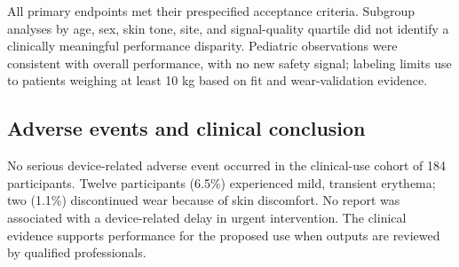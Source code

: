 All primary endpoints met their prespecified acceptance criteria. Subgroup analyses by age, sex, skin tone, site, and signal-quality quartile did not identify a clinically meaningful performance disparity. Pediatric observations were consistent with overall performance, with no new safety signal; labeling limits use to patients weighing at least 10 kg based on fit and wear-validation evidence.

\subsection{Adverse events and clinical conclusion}
No serious device-related adverse event occurred in the clinical-use cohort of 184 participants. Twelve participants (6.5\%) experienced mild, transient erythema; two (1.1\%) discontinued wear because of skin discomfort. No report was associated with a device-related delay in urgent intervention. The clinical evidence supports performance for the proposed use when outputs are reviewed by qualified professionals.

